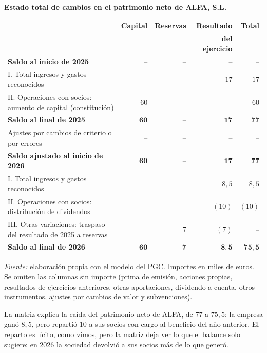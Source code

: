 \documentclass[10pt,a4paper]{article}
\begin{document}
\begin{center}\begin{minipage}{\linewidth}\centering
{\small\textbf{Estado total de cambios en el patrimonio neto de ALFA, S.L.}}\par\vspace{0.3em}
{\footnotesize
\begin{tabular}{p{7.6cm} r r r r}
\hline
& \textbf{Capital} & \textbf{Reservas} & \textbf{Resultado} & \textbf{Total} \\
& & & \textbf{del ejercicio} & \\
\hline
\textbf{Saldo al inicio de 2025} & -- & -- & -- & -- \tabularnewline
I. Total ingresos y gastos reconocidos & & & $17$ & $17$ \tabularnewline
II. Operaciones con socios: aumento de capital (constitución) & $60$ & & & $60$ \tabularnewline
\textbf{Saldo al final de 2025} & $\mathbf{60}$ & -- & $\mathbf{17}$ & $\mathbf{77}$ \tabularnewline
Ajustes por cambios de criterio o por errores & -- & -- & -- & -- \tabularnewline
\textbf{Saldo ajustado al inicio de 2026} & $\mathbf{60}$ & -- & $\mathbf{17}$ & $\mathbf{77}$ \tabularnewline
I. Total ingresos y gastos reconocidos & & & $8,5$ & $8,5$ \tabularnewline
II. Operaciones con socios: distribución de dividendos & & & $(10)$ & $(10)$ \tabularnewline
III. Otras variaciones: traspaso del resultado de 2025 a reservas & & $7$ & $(7)$ & -- \tabularnewline
\textbf{Saldo al final de 2026} & $\mathbf{60}$ & $\mathbf{7}$ & $\mathbf{8,5}$ & $\mathbf{75,5}$ \tabularnewline
\hline
\end{tabular}}\par\vspace{0.3em}
{\small\textit{Fuente: }elaboración propia con el modelo del PGC. Importes en miles de euros. Se omiten las columnas sin importe (prima de emisión, acciones propias, resultados de ejercicios anteriores, otras aportaciones, dividendo a cuenta, otros instrumentos, ajustes por cambios de valor y subvenciones).}
\end{minipage}\end{center}

La matriz explica la caída del patrimonio neto de ALFA, de $77$ a $75,5$: la empresa ganó $8,5$, pero repartió $10$ a sus socios con cargo al beneficio del año anterior. El reparto es lícito, como vimos, pero la matriz deja ver lo que el balance solo sugiere: en 2026 la sociedad devolvió a sus socios más de lo que generó.
\end{document}
